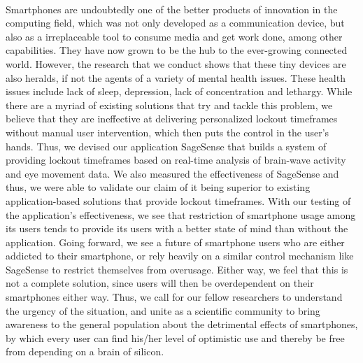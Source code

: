 \documentclass{article}
\begin{document}
\paragraph{} Smartphones are undoubtedly one of the better products of innovation in the computing field, which was not only developed as a communication device, but also as a irreplaceable tool to consume media and get work done, among other capabilities. They have now grown to be the hub to the ever-growing connected world. However, the research that we conduct shows that these tiny devices are also heralds, if not the agents of a variety of mental health issues. These health issues include lack of sleep, depression, lack of concentration and lethargy. While there are a myriad of existing solutions that try and tackle this problem, we believe that they are ineffective at delivering personalized lockout timeframes without manual user intervention, which then puts the control in the user's hands. Thus, we devised our application SageSense that builds a system of providing lockout timeframes based on real-time analysis of brain-wave activity and eye movement data. We also measured the effectiveness of SageSense and thus, we were able to validate our claim of it being superior to existing application-based solutions that provide lockout timeframes. With our testing of the application's effectiveness, we see that restriction of smartphone usage among its users tends to provide its users with a better state of mind than without the application. Going forward, we see a future of smartphone users who are either addicted to their smartphone, or rely heavily on a similar control mechanism like SageSense to restrict themselves from overusage. Either way, we feel that this is not a complete solution, since users will then be overdependent on their smartphones either way. Thus, we call for our fellow researchers to understand the urgency of the situation, and unite as a scientific community to bring awareness to the general population about the detrimental effects of smartphones, by which every user can find his/her level of optimistic use and thereby be free from depending on a brain of silicon.

\clearpage


\end{document}
